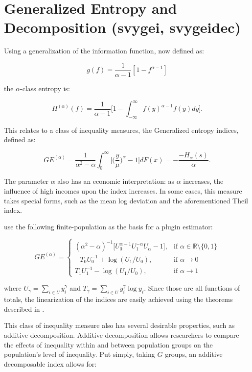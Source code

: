 \documentclass[
]{book}
\begin{document}
\hypertarget{generalized-entropy-and-decomposition-svygei-svygeidec}{%
\section{Generalized Entropy and Decomposition (svygei, svygeidec)}\label{generalized-entropy-and-decomposition-svygei-svygeidec}}

Using a generalization of the information function, now defined as:

\[
g(f) = \frac{1}{\alpha-1} [ 1 - f^{\alpha - 1} ]
\]

the \(\alpha\)-class entropy is:

\[
H^{(\alpha)} (f) = \frac{1}{\alpha - 1} \bigg[ 1 - \int_{-\infty}^{\infty} f(y)^{ \alpha - 1} f(y) dy \bigg] \text{.}
\]

This relates to a class of inequality measures, the Generalized entropy indices, defined as:

\[
GE^{(\alpha)} = \frac{1}{\alpha^2 - \alpha} \int_{0}^\infty \bigg[ \bigg( \frac{y}{\mu} \bigg)^\alpha - 1 \bigg]dF(x) = - \frac{-H_\alpha(s) }{ \alpha } \text{.}
\]

The parameter \(\alpha\) also has an economic interpretation: as \(\alpha\) increases, the influence of high incomes upon the index increases. In some cases, this measure takes special forms, such as the mean log deviation and the aforementioned Theil index.

\textcite{biewen2003} use the following finite-population as the basis for a plugin estimator:

\[
GE^{(\alpha)} =
\begin{cases}
( \alpha^2 - \alpha)^{-1} \big[ U_0^{\alpha - 1} U_1^{-\alpha} U_\alpha -1 \big], & \text{if } \alpha \in \mathbb{R} \setminus \{0,1\} \\
- T_0 U_0^{-1} + \log ( U_1 / U_0 ), &\text{if } \alpha \rightarrow 0 \\
T_1 U_1^{-1} - \log ( U_1 / U_0 ), & \text{if } \alpha \rightarrow 1
\end{cases}
\]

where \(U_\gamma = \sum_{i \in U} y_i^\gamma\) and \(T_\gamma = \sum_{i \in U} y_i^\gamma \log y_i\). Since those are all functions of totals, the linearization of the indices are easily achieved using the theorems described in \textcite{deville1999}.

This class of inequality measure also has several desirable properties, such as additive decomposition. Additive decomposition allows researchers to compare the effects of inequality within and between population groups on the population's level of inequality. Put simply, taking \(G\) groups, an additive decomposable index allows for:
\end{document}
